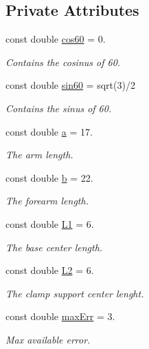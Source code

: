 \subsection*{Private Attributes}
\begin{DoxyCompactItemize}
\item 
const double \hyperlink{a00009_a86dc58ff23326f939cd6fb610ac90d53}{cos60} = 0.
\begin{DoxyCompactList}\small\item\em Contains the cosinus of 60. \end{DoxyCompactList}\item 
const double \hyperlink{a00009_aaa3e2dd194949b12f8a41ebd0d62fde9}{sin60} = sqrt(3)/2
\begin{DoxyCompactList}\small\item\em Contains the sinus of 60. \end{DoxyCompactList}\item 
const double \hyperlink{a00009_a7dc3998d380d61406fe4485f9872edff}{a} = 17.
\begin{DoxyCompactList}\small\item\em The arm length. \end{DoxyCompactList}\item 
const double \hyperlink{a00009_a14f03febaa39a60b9bf7ff9b9151060c}{b} = 22.
\begin{DoxyCompactList}\small\item\em The forearm length. \end{DoxyCompactList}\item 
const double \hyperlink{a00009_a6281142e50115dd8c914c14cfae6f90d}{L1} = 6.
\begin{DoxyCompactList}\small\item\em The base center length. \end{DoxyCompactList}\item 
const double \hyperlink{a00009_a3d51c16b1f498b48a6ecbfaadaba6ed2}{L2} = 6.
\begin{DoxyCompactList}\small\item\em The clamp support center lenght. \end{DoxyCompactList}\item 
const double \hyperlink{a00009_a3ecb7da23afe91883435f239bd08ceb3}{max\+Err} = 3.
\begin{DoxyCompactList}\small\item\em Max available error. \end{DoxyCompactList}\item 

\end{DoxyCompactItemize}
